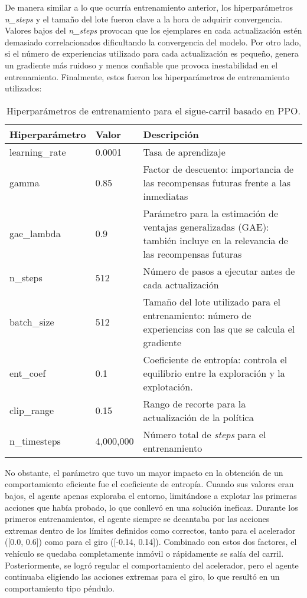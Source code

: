 De manera similar a lo que ocurría entrenamiento anterior, los hiperparámetros \textit{n\_steps} y el tamaño del lote fueron clave a la hora de adquirir convergencia. Valores bajos del \textit{n\_steps} provocan que los ejemplares en cada actualización estén demasiado correlacionados dificultando la convergencia del modelo. Por otro lado, si el número de experiencias utilizado para cada actualización es pequeño, genera un gradiente más ruidoso y menos confiable que provoca inestabilidad en el entrenamiento. Finalmente, estos fueron los hiperparámetros de entrenamiento utilizados:
\begin{table}[ht]
\centering
\begin{tabular}{|l|l|p{9cm}|}
\hline
\textbf{Hiperparámetro} & \textbf{Valor} & \textbf{Descripción} \\ \hline
learning\_rate & 0.0001 & Tasa de aprendizaje \\ \hline
gamma & 0.85 & Factor de descuento: importancia de las recompensas futuras frente a las inmediatas\\ \hline
gae\_lambda & 0.9 & Parámetro para la estimación de ventajas generalizadas (GAE): también incluye en la relevancia de las recompensas futuras \\ \hline
n\_steps & 512 & Número de pasos a ejecutar antes de cada actualización \\ \hline
batch\_size & 512 & Tamaño del lote utilizado para el entrenamiento: número de experiencias con las que se calcula el gradiente \\ \hline
ent\_coef & 0.1 & Coeficiente de entropía: controla el equilibrio entre la exploración y la explotación. \\ \hline
clip\_range & 0.15 & Rango de recorte para la actualización de la política \\ \hline
n\_timesteps & 4,000,000 & Número total de \textit{steps} para el entrenamiento \\ \hline
\end{tabular}
\caption{Hiperparámetros de entrenamiento para el sigue-carril basado en \ac{PPO}.}
\label{tab:hiper_params_ppo}
\end{table}

\newpage

No obstante, el parámetro que tuvo un mayor impacto en la obtención de un comportamiento eficiente fue el coeficiente de entropía. Cuando sus valores eran bajos, el agente apenas exploraba el entorno, limitándose a explotar las primeras acciones que había probado, lo que conllevó en una solución ineficaz. Durante los primeros entrenamientos, el agente siempre se decantaba por las acciones extremas dentro de los límites definidos como correctos, tanto para el acelerador ([0.0, 0.6]) como para el giro ([-0.14, 0.14]). Combinado con estos dos factores, el vehículo se quedaba completamente inmóvil o rápidamente se salía del carril. Posteriormente, se logró regular el comportamiento del acelerador, pero el agente continuaba eligiendo las acciones extremas para el giro, lo que resultó en un comportamiento tipo péndulo. 

